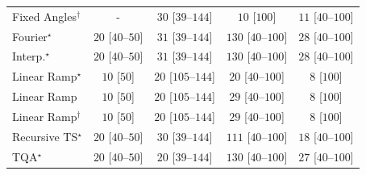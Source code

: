\begin{tabular}{l|cccc|}
Fixed Angles$^\dagger$ & {\cellcolor[HTML]{000000}} \color[HTML]{F1F1F1} {\cellcolor{white}} \color{black} - & {\cellcolor[HTML]{F3FAF0}} \color[HTML]{000000} $30$ [$39$--$144$] & {\cellcolor[HTML]{F7FCF5}} \color[HTML]{000000} $10$ [$100$] & {\cellcolor[HTML]{F6FCF4}} \color[HTML]{000000} $11$ [$40$--$100$] \\
Fourier$^\star$ & {\cellcolor[HTML]{F5FBF2}} \color[HTML]{000000} $20$ [$40$--$50$] & {\cellcolor[HTML]{F3FAF0}} \color[HTML]{000000} $31$ [$39$--$144$] & {\cellcolor[HTML]{DDF2D8}} \color[HTML]{000000} $130$ [$40$--$100$] & {\cellcolor[HTML]{F4FBF1}} \color[HTML]{000000} $28$ [$40$--$100$] \\
Interp.$^\star$ & {\cellcolor[HTML]{F5FBF2}} \color[HTML]{000000} $20$ [$40$--$50$] & {\cellcolor[HTML]{F3FAF0}} \color[HTML]{000000} $31$ [$39$--$144$] & {\cellcolor[HTML]{DDF2D8}} \color[HTML]{000000} $130$ [$40$--$100$] & {\cellcolor[HTML]{F4FBF1}} \color[HTML]{000000} $28$ [$40$--$100$] \\
Linear Ramp$^\star$ & {\cellcolor[HTML]{F7FCF5}} \color[HTML]{000000} $10$ [$50$] & {\cellcolor[HTML]{F5FBF2}} \color[HTML]{000000} $20$ [$105$--$144$] & {\cellcolor[HTML]{F5FBF2}} \color[HTML]{000000} $20$ [$40$--$100$] & {\cellcolor[HTML]{F7FCF5}} \color[HTML]{000000} $8$ [$100$] \\
Linear Ramp & {\cellcolor[HTML]{F7FCF5}} \color[HTML]{000000} $10$ [$50$] & {\cellcolor[HTML]{F5FBF2}} \color[HTML]{000000} $20$ [$105$--$144$] & {\cellcolor[HTML]{F3FAF0}} \color[HTML]{000000} $29$ [$40$--$100$] & {\cellcolor[HTML]{F7FCF5}} \color[HTML]{000000} $8$ [$100$] \\
Linear Ramp$^\dagger$ & {\cellcolor[HTML]{F7FCF5}} \color[HTML]{000000} $10$ [$50$] & {\cellcolor[HTML]{F5FBF2}} \color[HTML]{000000} $20$ [$105$--$144$] & {\cellcolor[HTML]{F3FAF0}} \color[HTML]{000000} $29$ [$40$--$100$] & {\cellcolor[HTML]{F7FCF5}} \color[HTML]{000000} $8$ [$100$] \\
Recursive TS$^\star$ & {\cellcolor[HTML]{F5FBF2}} \color[HTML]{000000} $20$ [$40$--$50$] & {\cellcolor[HTML]{F3FAF0}} \color[HTML]{000000} $30$ [$39$--$144$] & {\cellcolor[HTML]{E3F4DE}} \color[HTML]{000000} $111$ [$40$--$100$] & {\cellcolor[HTML]{F5FBF3}} \color[HTML]{000000} $18$ [$40$--$100$] \\
TQA$^\star$ & {\cellcolor[HTML]{F5FBF2}} \color[HTML]{000000} $20$ [$40$--$50$] & {\cellcolor[HTML]{F5FBF2}} \color[HTML]{000000} $20$ [$39$--$144$] & {\cellcolor[HTML]{DDF2D8}} \color[HTML]{000000} $130$ [$40$--$100$] & {\cellcolor[HTML]{F4FBF1}} \color[HTML]{000000} $27$ [$40$--$100$] \\

\end{tabular}
